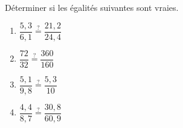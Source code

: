 \begin{exercice*}
    Déterminer si les égalités suivantes sont vraies.
    \begin{enumerate}
        \item $\dfrac{5{,}3}{6{,}1}\overset{?}{=}\dfrac{21{,}2}{24{,}4}$\smallskip
        \item $\dfrac{72}{32}\overset{?}{=}\dfrac{360}{160}$\smallskip
        \item $\dfrac{5{,}1}{9{,}8}\overset{?}{=}\dfrac{5{,}3}{10}$\smallskip
        \item $\dfrac{4{,}4}{8{,}7}\overset{?}{=}\dfrac{30{,}8}{60{,}9}$
    \end{enumerate}
\end{exercice*}
